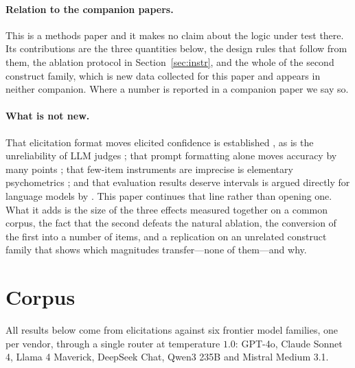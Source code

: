 \documentclass[11pt,letterpaper]{article}
\begin{document}
\paragraph{Relation to the companion papers.} This is a methods paper and it makes no claim
about the logic under test there. Its contributions are the three quantities below, the design
rules that follow from them, the ablation protocol in Section~\ref{sec:instr}, and the whole of
the second construct family, which is new data collected for this paper and appears in neither
companion. Where a number is reported in a companion paper we say so.

\paragraph{What is not new.} That elicitation format moves elicited confidence is established
\citep{protocolsens2026}, as is the unreliability of LLM judges \citep{coinflip2026}; that
prompt formatting alone moves accuracy by many points \citep{sclar2024quantifying}; that
few-item instruments are imprecise is elementary psychometrics \citep{cronbach1972}; and that evaluation results deserve intervals is argued directly for
language models by \citet{miller2024errorbars}. This paper continues that line rather
than opening one. What it adds is the size of the three effects measured together on a common
corpus, the fact that the second defeats the natural ablation, the conversion of the first
into a number of items, and a replication on an unrelated construct family that shows which
magnitudes transfer---none of them---and why.

\section{Corpus}
\label{sec:corpus}

All results below come from elicitations against six frontier model families, one per vendor,
through a single router at temperature $1.0$: GPT-4o, Claude Sonnet 4, Llama 4 Maverick,
DeepSeek Chat, Qwen3 235B and Mistral Medium 3.1.
\end{document}
